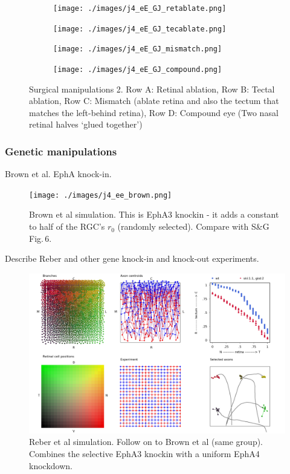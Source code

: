 \documentclass[11pt, a4paper]{article}
\begin{document}
\begin{figure}
\begin{subfigure}{\linewidth}
\texttt{[image: ./images/j4\_eE\_GJ\_retablate.png]}
\end{subfigure}
\begin{subfigure}{\linewidth}
\texttt{[image: ./images/j4\_eE\_GJ\_tecablate.png]}
\end{subfigure}
\begin{subfigure}{\linewidth}
\texttt{[image: ./images/j4\_eE\_GJ\_mismatch.png]}
\end{subfigure}
\begin{subfigure}{\linewidth}
\texttt{[image: ./images/j4\_eE\_GJ\_compound.png]}
\end{subfigure}
\caption{Surgical manipulations 2. Row A: Retinal ablation, Row B: Tectal
ablation, Row C: Mismatch (ablate retina and also the tectum that matches the
left-behind retina), Row D: Compound eye (Two nasal retinal halves `glued
together')}
\label{f:surg2}
\end{figure}

\subsubsection*{Genetic manipulations}

Brown et al. EphA knock-in.

\begin{figure}
\texttt{[image: ./images/j4\_ee\_brown.png]}
\caption{Brown et al simulation. This is EphA3 knockin - it adds a constant to
half of the RGC's $r_0$ (randomly selected). Compare with S\&G Fig.\,6.}
\label{f:brown}
\end{figure}

Describe Reber and other gene knock-in and knock-out experiments.

\begin{figure}
\includegraphics[width=\linewidth]{./images/j4_ee_reber.png}
\caption{Reber et al simulation. Follow on to Brown et al (same
group). Combines the selective EphA3 knockin with a uniform EphA4 knockdown.}
\label{f:reber}
\end{figure}
\end{document}
